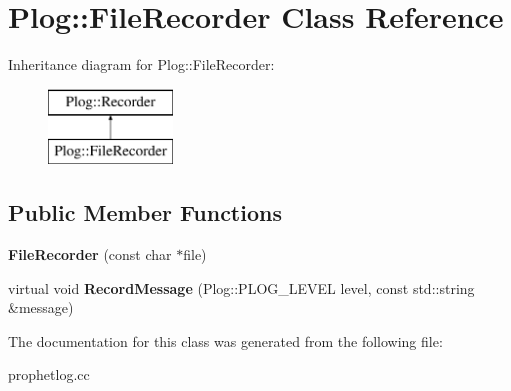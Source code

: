 \hypertarget{classPlog_1_1FileRecorder}{
\section{Plog::FileRecorder Class Reference}
\label{classPlog_1_1FileRecorder}
}
Inheritance diagram for Plog::FileRecorder:\begin{figure}[H]
\begin{center}
\leavevmode
\includegraphics[height=2cm]{classPlog_1_1FileRecorder}
\end{center}
\end{figure}
\subsection*{Public Member Functions}
\begin{DoxyCompactItemize}
\item 
\hypertarget{classPlog_1_1FileRecorder_af397f154039c536cd86aeeae729009d2}{
{\bfseries FileRecorder} (const char $\ast$file)}
\label{classPlog_1_1FileRecorder_af397f154039c536cd86aeeae729009d2}

\item 
\hypertarget{classPlog_1_1FileRecorder_a39a37f25e913858b9b4bcfefcabb114f}{
virtual void {\bfseries RecordMessage} (Plog::PLOG\_\-LEVEL level, const std::string \&message)}
\label{classPlog_1_1FileRecorder_a39a37f25e913858b9b4bcfefcabb114f}

\end{DoxyCompactItemize}


The documentation for this class was generated from the following file:\begin{DoxyCompactItemize}
\item 
prophetlog.cc\end{DoxyCompactItemize}
